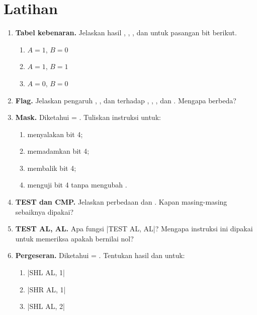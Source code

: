 \section{Latihan}
\label{sec:latihan-bab11}

\begin{enumerate}
    \item \textbf{Tabel kebenaran.} Jelaskan hasil ,
          , , dan  untuk pasangan bit
          berikut.
          \begin{enumerate}
              \item $A = 1$, $B = 0$
              \item $A = 1$, $B = 1$
              \item $A = 0$, $B = 0$
          \end{enumerate}

    \item \textbf{Flag.} Jelaskan pengaruh , , dan
           terhadap , , , dan
          . Mengapa  berbeda?

    \item \textbf{Mask.} Diketahui  = . Tuliskan
          instruksi untuk:
          \begin{enumerate}
              \item menyalakan bit 4;
              \item memadamkan bit 4;
              \item membalik bit 4;
              \item menguji bit 4 tanpa mengubah .
          \end{enumerate}

    \item \textbf{TEST dan CMP.} Jelaskan perbedaan  dan
          . Kapan masing-masing sebaiknya dipakai?

    \item \textbf{TEST AL, AL.} Apa fungsi \lstasm|TEST AL, AL|?
          Mengapa instruksi ini dipakai untuk memeriksa apakah
           bernilai nol?

    \item \textbf{Pergeseran.} Diketahui  = .
          Tentukan hasil dan  untuk:
          \begin{enumerate}
              \item \lstasm|SHL AL, 1|
              \item \lstasm|SHR AL, 1|
              \item \lstasm|SHL AL, 2|
          \end{enumerate}


\end{enumerate}
